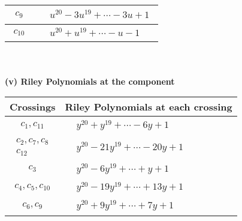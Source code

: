\documentclass[1p]{elsarticle_modified}
\theoremstyle{definition}
\begin{document}
\begin{tabular}{m{50pt}|m{274pt}}
\hline $$\begin{aligned}c_{9}\end{aligned}$$&$\begin{aligned}
&u^{20}-3 u^{19}+\cdots-3 u+1
\end{aligned}$\\
\hline $$\begin{aligned}c_{10}\end{aligned}$$&$\begin{aligned}
&u^{20}+u^{19}+\cdots- u-1
\end{aligned}$\\
\hline
\end{tabular}\\~\\
\newpage\renewcommand{\arraystretch}{1}
\flushleft \textbf{(v) Riley Polynomials at the component}\newline \\
\begin{tabular}{m{50pt}|m{274pt}}
Crossings & \hspace{64pt}Riley Polynomials at each crossing \\
\hline $$\begin{aligned}c_{1},c_{11}\end{aligned}$$&$\begin{aligned}
&y^{20}+y^{19}+\cdots-6 y+1
\end{aligned}$\\
\hline $$\begin{aligned}c_{2},c_{7},c_{8}\\c_{12}\end{aligned}$$&$\begin{aligned}
&y^{20}-21 y^{19}+\cdots-20 y+1
\end{aligned}$\\
\hline $$\begin{aligned}c_{3}\end{aligned}$$&$\begin{aligned}
&y^{20}-6 y^{19}+\cdots+y+1
\end{aligned}$\\
\hline $$\begin{aligned}c_{4},c_{5},c_{10}\end{aligned}$$&$\begin{aligned}
&y^{20}-19 y^{19}+\cdots+13 y+1
\end{aligned}$\\
\hline $$\begin{aligned}c_{6},c_{9}\end{aligned}$$&$\begin{aligned}
&y^{20}+9 y^{19}+\cdots+7 y+1
\end{aligned}$\\
\hline
\end{tabular}\\~\\
\end{document}
